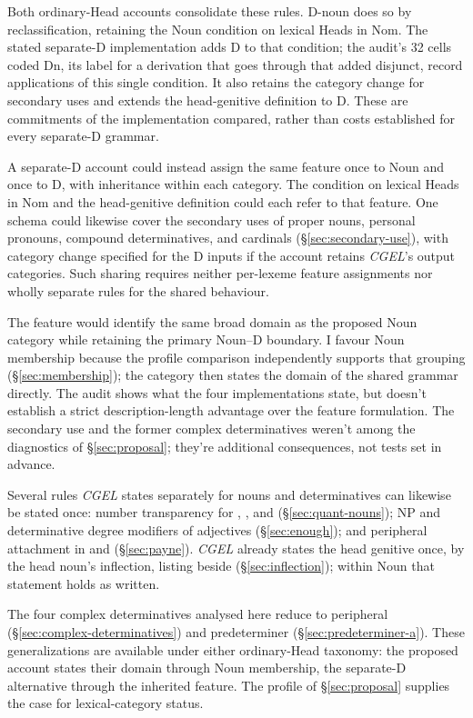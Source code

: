 \documentclass[12pt]{article}
\begin{document}
Both ordinary-Head accounts consolidate these rules. D-noun does so by reclassification, retaining the Noun condition on lexical Heads in Nom. The stated separate-D implementation adds D to that condition; the audit's 32 cells coded Dn, its label for a derivation that goes through that added disjunct, record applications of this single condition. It also retains the category change for secondary uses and extends the head-genitive definition to D. These are commitments of the implementation compared, rather than costs established for every separate-D grammar.

A separate-D account could instead assign the same feature once to Noun and once to D, with inheritance within each category. The condition on lexical Heads in Nom and the head-genitive definition could each refer to that feature. One schema could likewise cover the secondary uses of proper nouns, personal pronouns, compound determinatives, and cardinals (§\ref{sec:secondary-use}), with category change specified for the D inputs if the account retains \textit{CGEL}'s output categories. Such sharing requires neither per-lexeme feature assignments nor wholly separate rules for the shared behaviour.

The feature would identify the same broad domain as the proposed Noun category while retaining the primary Noun--D boundary. I favour Noun membership because the profile comparison independently supports that grouping (§\ref{sec:membership}); the category then states the domain of the shared grammar directly. The audit shows what the four implementations state, but doesn't establish a strict description-length advantage over the feature formulation. The secondary use and the former complex determinatives weren't among the diagnostics of §\ref{sec:proposal}; they're additional consequences, not tests set in advance.

Several rules \textit{CGEL} states separately for nouns and determinatives can likewise be stated once: number transparency for , , and  (§\ref{sec:quant-nouns}); NP and determinative degree modifiers of adjectives (§\ref{sec:enough}); and peripheral attachment in  and  (§\ref{sec:payne}). \textit{CGEL} already states the head genitive once, by the head noun's inflection, listing  beside  (§\ref{sec:inflection}); within Noun that statement holds as written.

The four complex determinatives analysed here reduce to peripheral  (§\ref{sec:complex-determinatives}) and predeterminer  (§\ref{sec:predeterminer-a}). These generalizations are available under either ordinary-Head taxonomy: the proposed account states their domain through Noun membership, the separate-D alternative through the inherited feature. The profile of §\ref{sec:proposal} supplies the case for lexical-category status.
\end{document}
